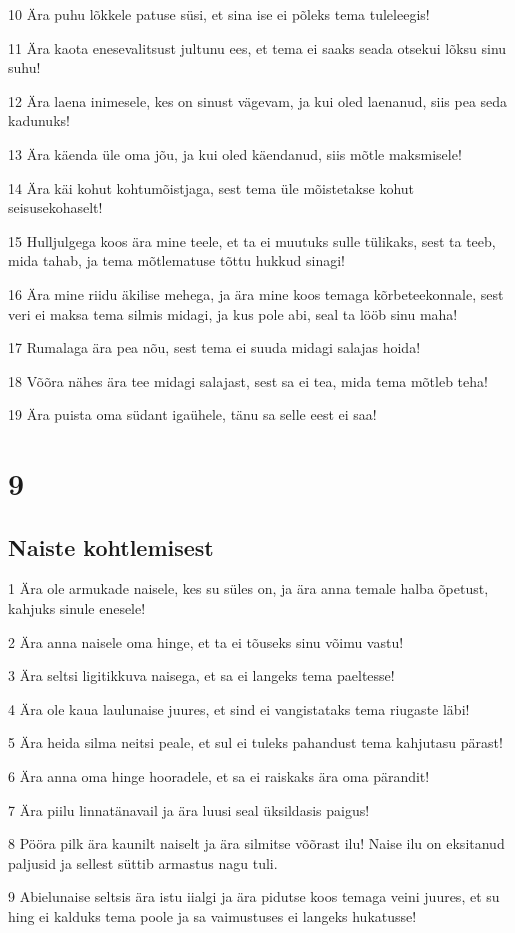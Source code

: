 \par 10 Ära puhu lõkkele patuse süsi, et sina ise ei põleks tema tuleleegis!
\par 11 Ära kaota enesevalitsust jultunu ees, et tema ei saaks seada otsekui lõksu sinu suhu!
\par 12 Ära laena inimesele, kes on sinust vägevam, ja kui oled laenanud, siis pea seda kadunuks!
\par 13 Ära käenda üle oma jõu, ja kui oled käendanud, siis mõtle maksmisele!
\par 14 Ära käi kohut kohtumõistjaga, sest tema üle mõistetakse kohut seisusekohaselt!
\par 15 Hulljulgega koos ära mine teele, et ta ei muutuks sulle tülikaks, sest ta teeb, mida tahab, ja tema mõtlematuse tõttu hukkud sinagi!
\par 16 Ära mine riidu äkilise mehega, ja ära mine koos temaga kõrbeteekonnale, sest veri ei maksa tema silmis midagi, ja kus pole abi, seal ta lööb sinu maha!
\par 17 Rumalaga ära pea nõu, sest tema ei suuda midagi salajas hoida!
\par 18 Võõra nähes ära tee midagi salajast, sest sa ei tea, mida tema mõtleb teha!
\par 19 Ära puista oma südant igaühele, tänu sa selle eest ei saa!

\chapter{9}

\section*{Naiste kohtlemisest}

\par 1 Ära ole armukade naisele, kes su süles on, ja ära anna temale halba õpetust, kahjuks sinule enesele!
\par 2 Ära anna naisele oma hinge, et ta ei tõuseks sinu võimu vastu!
\par 3 Ära seltsi ligitikkuva naisega, et sa ei langeks tema paeltesse!
\par 4 Ära ole kaua laulunaise juures, et sind ei vangistataks tema riugaste läbi!
\par 5 Ära heida silma neitsi peale, et sul ei tuleks pahandust tema kahjutasu pärast!
\par 6 Ära anna oma hinge hooradele, et sa ei raiskaks ära oma pärandit!
\par 7 Ära piilu linnatänavail ja ära luusi seal üksildasis paigus!
\par 8 Pööra pilk ära kaunilt naiselt ja ära silmitse võõrast ilu! Naise ilu on eksitanud paljusid ja sellest süttib armastus nagu tuli.
\par 9 Abielunaise seltsis ära istu iialgi ja ära pidutse koos temaga veini juures, et su hing ei kalduks tema poole ja sa vaimustuses ei langeks hukatusse!

